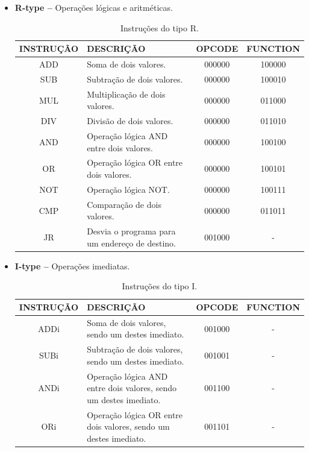 \documentclass{report}
\begin{document}
  \begin{itemize}
    \item \textbf{R-type --} Operações lógicas e aritméticas.
    
	\begin{table}[H]
	\centering
	\begin{tabular}{|c|m{6cm}|c|c|}
  	\hline 
  	\textbf{INSTRUÇÃO} & \textbf{DESCRIÇÃO} & \textbf{OPCODE} & \textbf{FUNCTION} \\ 
  	\hline   	
  	ADD & Soma de dois valores. & 000000 & 100000 \\ \hline
  	SUB & Subtração de dois valores. & 000000 & 100010 \\ \hline
  	MUL & Multiplicação de dois valores. & 000000 & 011000 \\ \hline
  	DIV & Divisão de dois valores. & 000000 & 011010 \\ \hline
  	AND & Operação lógica AND entre dois valores. & 000000 & 100100 \\ \hline
  	OR & Operação lógica OR entre dois valores. & 000000 & 100101 \\ \hline
  	NOT & Operação lógica NOT. & 000000 & 100111 \\ \hline
  	CMP & Comparação de dois valores. & 000000 & 011011 \\ \hline
  	JR & Desvia o programa para um endereço de destino. & 001000 & - \\ \hline
  	\end{tabular} 
  	\caption{Instruções do tipo R.}
  \end{table}    

    \item \textbf{I-type --} Operações imediatas.
    
	\begin{table}[H]
	\centering
	\begin{tabular}{|c|m{6cm}|c|c|}
  	\hline 
  	\textbf{INSTRUÇÃO} & \textbf{DESCRIÇÃO} & \textbf{OPCODE} & \textbf{FUNCTION} \\ 
  	\hline 
  	ADDi &  Soma de dois valores, sendo um destes imediato. & 001000 & - \\ \hline
  	SUBi & Subtração de dois valores, sendo um destes imediato. & 001001 & - \\ \hline
  	ANDi & Operação lógica AND entre dois valores, sendo um destes imediato. & 001100 & - \\ \hline
  	ORi & Operação lógica OR entre dois valores, sendo um destes imediato. & 001101 & - \\ \hline
  	\end{tabular} 
  	\caption{Instruções do tipo I.}
  \end{table}


\end{itemize}
\end{document}
